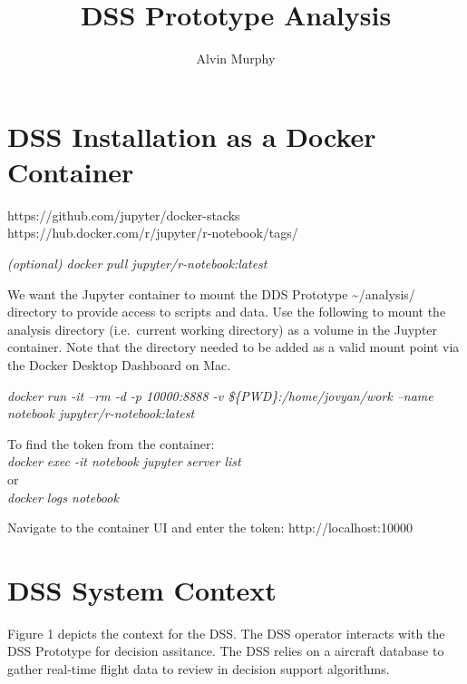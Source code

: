 \documentclass[
  letterpaper,
  DIV=11,
  numbers=noendperiod]{scrartcl}
\title{DSS Prototype Analysis}
\author{Alvin Murphy}
\date{}
\renewcommand*\contentsname{Table of contents}
\newcommand\contentsname{Table of contents}
\begin{document}
\maketitle
\ifdefined\Shaded\renewenvironment{Shaded}{\begin{tcolorbox}[borderline west={3pt}{0pt}{shadecolor}, sharp corners, interior hidden, frame hidden, boxrule=0pt, enhanced, breakable]}{\end{tcolorbox}}\fi

\renewcommand*\contentsname{Table of contents}
{
\hypersetup{linkcolor=}
\setcounter{tocdepth}{3}
\tableofcontents
}
\newpage

\hypertarget{dss-installation-as-a-docker-container}{%
\section{DSS Installation as a Docker
Container}\label{dss-installation-as-a-docker-container}}

https://github.com/jupyter/docker-stacks\\
https://hub.docker.com/r/jupyter/r-notebook/tags/

\emph{(optional) docker pull jupyter/r-notebook:latest}

We want the Jupyter container to mount the DDS Prototype
\textasciitilde/analysis/ directory to provide access to scripts and
data. Use the following to mount the analysis directory (i.e.~current
working directory) as a volume in the Juypter container. Note that the
directory needed to be added as a valid mount point via the Docker
Desktop Dashboard on Mac.

\emph{docker run -it --rm -d -p 10000:8888 -v
\$\{PWD\}:/home/jovyan/work --name notebook jupyter/r-notebook:latest}

To find the token from the container:\\
\emph{docker exec -it notebook jupyter server list}\\
or\\
\emph{docker logs notebook}

Navigate to the container UI and enter the token: http://localhost:10000

\hypertarget{dss-system-context}{%
\section{DSS System Context}\label{dss-system-context}}

Figure 1 depicts the context for the DSS. The DSS operator interacts
with the DSS Prototype for decision assitance. The DSS relies on a
aircraft database to gather real-time flight data to review in decision
support algorithms.
\end{document}
